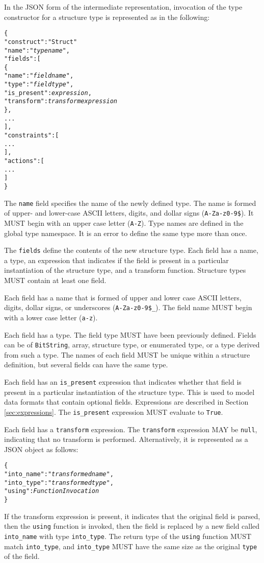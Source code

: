 \documentclass[10pt,twocolumn,a4paper]{article}
\newcommand{\code}[1]{\texttt{#1}}
\begin{document}
In the JSON form of the intermediate representation, invocation of the type
constructor for a structure type is represented as in the following:
\footnotesize
\begin{alltt}
  \{
    "construct"   : "Struct"
    "name"        : "\emph{type name}",
    "fields"      : [
      \{
        "name"       : "\emph{field name}",
        "type"       : "\emph{field type}",
        "is\_present" : \emph{expression},
        "transform"  : \emph{transform expression}
      \},
      ...
    ],
    "constraints" : [
      ...
    ],
    "actions" : [
      ...
    ]
  \}
\end{alltt}
\normalsize
The \code{name} field specifies the name of the newly defined type. The
name is formed of upper- and lower-case ASCII letters, digits, and dollar
signs (\code{A-Za-z0-9\$}).  It MUST begin with an upper case letter
(\code{A-Z}). Type names are defined in the global type namespace.
It is an error to define the same type more than once.

The \code{fields} define the contents of the new structure type. Each
field has a name, a type, an expression that indicates if the field is
present in a particular instantiation of the structure type, and a
transform function. Structure types MUST contain at least one field.

Each field has a name that is formed of upper and lower case ASCII letters,
digits, dollar signs, or underscores (\code{A-Za-z0-9\$\_}). The field name
MUST begin with a lower case letter (\code{a-z}).

Each field has a type. The field type MUST have been previously defined.
Fields can be of \code{BitString}, array, structure type, or enumerated type,
or a type derived from such a type. The names of each field MUST be unique
within a structure definition, but several fields can have the same type.

Each field has an \code{is\_present} expression that indicates
whether that field is present in a particular instantiation of the
structure type. This is used to model data formats that contain optional
fields. Expressions are described in Section \ref{sec:expressions}. The
\code{is\_present} expression MUST evaluate to \code{True}.

Each field has a \code{transform} expression.
The \code{transform} expression MAY be \code{null}, indicating that no
transform is performed.
Alternatively, it is represented as a JSON object as follows:
\footnotesize
\begin{alltt}
  \{
    "into\_name" : "\emph{transformed name}",
    "into\_type" : "\emph{transformed type}",
    "using"      : \emph{FunctionInvocation}
  \}
\end{alltt}
\normalsize
If the transform expression is present, it indicates that the original
field is parsed, then the \code{using} function is invoked, then the field
is replaced by a new field called \code{into\_name} with type \code{into\_type}.
The return type of the \code{using} function MUST match \code{into\_type},
and \code{into\_type} MUST have the same size as the original \code{type}
of the field.
\end{document}
